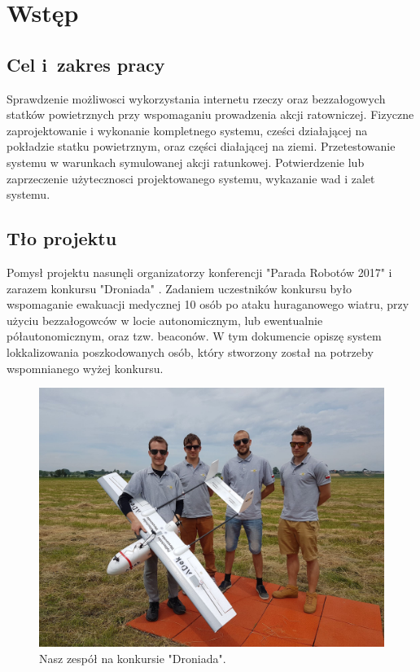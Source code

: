 \section{Wstęp}
\suppressfloats[t]  %
\subsection{Cel i~zakres pracy}
Sprawdzenie możliwosci wykorzystania internetu rzeczy oraz bezzałogowych statków powietrznych przy wspomaganiu prowadzenia akcji ratowniczej. Fizyczne zaprojektowanie i wykonanie kompletnego systemu, cześci działającej na pokładzie statku powietrznym, oraz części diałającej na ziemi. Przetestowanie systemu w warunkach symulowanej akcji ratunkowej. Potwierdzenie lub zaprzeczenie użytecznosci projektowanego systemu, wykazanie wad i zalet systemu.
\subsection{Tło projektu}
Pomysł projektu nasunęli organizatorzy konferencji "Parada Robotów 2017" i zarazem konkursu "Droniada" \cite{droniada}. Zadaniem uczestników konkursu było wspomaganie ewakuacji medycznej 10 osób po ataku huraganowego wiatru, przy użyciu bezzałogowców w locie autonomicznym, lub ewentualnie półautonomicznym, oraz tzw. beaconów. W tym dokumencie opiszę system lokkalizowania poszkodowanych osób, który stworzony został na potrzeby wspomnianego wyżej konkursu.

\begin{figure}[!th]
    \centering
    \includegraphics[width=15cm]{zalaczniki/obrazy/droniada.jpg}
    \caption{Nasz zespół na konkursie "Droniada".}
    \label{fig:triage}
\end{figure}

